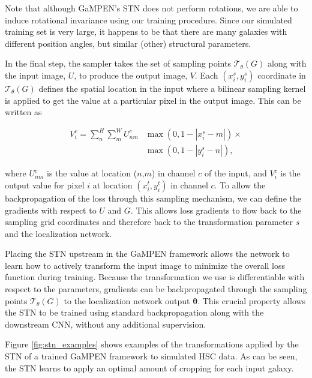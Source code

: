 \documentclass[twocolumn]{aastex63}
\newcommand\gampen{GaMPEN}
\begin{document}
\begin{CJK*}{UTF8}{gbsn}
Note that although \gampen{}'s STN does not perform rotations, we are able to induce rotational invariance using our training procedure.  Since our simulated training set is very large, it happens to be that there are many galaxies with different position angles, but similar (other) structural parameters.

In the final step, the sampler takes the set of sampling points $\mathcal{T}_\theta(G)$ along with the input image, $U$, to produce the output image, $V$. Each $ \left(x_i^s,y_i^s\right)$ coordinate in $\mathcal{T}_\theta(G)$ defines the spatial location in the input where a bilinear sampling kernel is applied to get the value at a particular pixel in the output image. This can be written as 

\begin{equation}
\begin{split}
V_{i}^{c}=\sum_{n}^{H} \sum_{m}^{W} U_{n m}^{c} & \max \left(0,1-\left|x_{i}^{s}-m\right|\right) \times \\ & \max \left(0,1-\left|y_{i}^{s}-n\right|\right) , 
\end{split}
\label{eq:smapling_v}
\end{equation}

\noindent
where $U_{n m}^{c}$ is the value at location ($n$,$m$) in channel $c$ of the input, and $V_{i}^{c}$ is the output value for pixel $i$ at location $\left(x_i^t,y_i^t\right)$ in channel $c$. To allow the backpropagation of the loss through this sampling mechanism, we can define the gradients with respect to $U$ and $G$. This allows loss gradients to flow back to the sampling grid coordinates and therefore back to the transformation parameter $s$ and the localization network.

Placing the STN upstream in the \gampen{} framework allows the network to learn how to actively transform the input image to minimize the overall loss function during training. Because the transformation we use is differentiable with respect to the parameters, gradients can be backpropagated through the sampling points $\mathcal{T}_\theta(G)$ to the localization network output $\boldsymbol{\theta}$. This crucial property allows the STN to be trained using standard backpropagation along with the downstream CNN, without any additional supervision. 

Figure \ref{fig:stn_examples} shows examples of the transformations applied by the STN of a trained \gampen{} framework to simulated HSC data. As can be seen, the STN learns to apply an optimal amount of cropping for each input galaxy. 


\end{CJK*}
\end{document}
